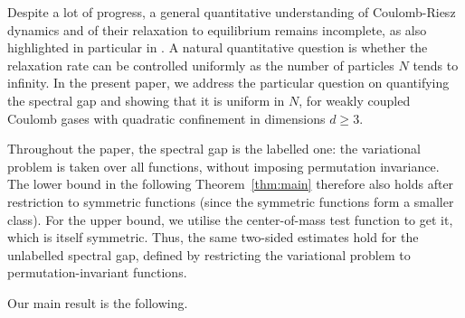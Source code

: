 \documentclass[12pt,reqno,letterpaper]{amsart}
\theoremstyle{definition}
\theoremstyle{remark}
\numberwithin{equation}{section}
\newcommand{\R}{\mathbb R}
\begin{document}


Despite a lot of progress, a general quantitative understanding of Coulomb-Riesz dynamics and of their relaxation to equilibrium remains incomplete, as also highlighted in particular in \cite[page 8]{SerfatyLectures}. A natural quantitative question is whether the relaxation rate can be controlled uniformly as the number of particles \(N\) tends to infinity. In the present paper, we address the particular question on quantifying the spectral gap and showing that it is uniform in \(N\), for weakly coupled Coulomb gases with quadratic confinement in dimensions \(d\ge3\).

Throughout the paper, the spectral gap is the labelled one: the variational
problem is taken over all functions, without imposing permutation
invariance.
The lower bound in the following Theorem~\ref{thm:main} therefore also holds after restriction to symmetric functions (since the symmetric functions form a smaller class). For the upper bound, we utilise the center-of-mass test function to get it, which is itself symmetric. Thus, the same two-sided estimates hold for the unlabelled spectral gap, defined
by restricting the variational problem to permutation-invariant functions.

  
Our main result is the following.

\end{document}
